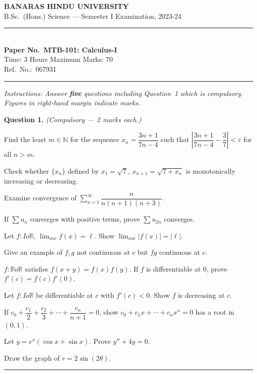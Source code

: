 \documentclass[11pt,a4paper]{article}
\begin{document}
\begin{center}
  {\large\bfseries BANARAS HINDU UNIVERSITY}\\[2pt]
  {\normalsize B.Sc.\ (Hons.) Science --- Semester I Examination, 2023-24}\\[6pt]
  \rule{0.8\linewidth}{0.5pt}\\[6pt]
  {\large\bfseries Paper No.\ MTB-101: Calculus-I}\\[4pt]
  {\normalsize Time: 3 Hours \hfill Maximum Marks: 70}\\[2pt]
  {\small Ref.\ No.:\ 067931}
\end{center}
\rule{\linewidth}{0.4pt}
\smallskip



\noindent   \textit{Instructions: Answer   \textbf{five} questions including Question~1 which is compulsory. Figures in right-hand margin indicate marks.}
\bigskip




\noindent   \textbf{Question 1.}   \textit{(Compulsory --- 2 marks each.)}

\begin{parts}
  \item Find the least $m\in\mathbb{N}$ for the sequence $x_n=\dfrac{3n+1}{7n-4}$ such that $\left|\dfrac{3n+1}{7n-4}-\dfrac{3}{7}\right|<\varepsilon$ for all $n>m$.
  \item Check whether $\{x_n\}$ defined by $x_1=\sqrt{7}$, $x_{n+1}=\sqrt{7+x_n}$ is monotonically increasing or decreasing.
  \item Examine convergence of $\sum_{n=1}^{\infty}\dfrac{n}{n(n+1)(n+3)}$.
  \item If $\sum u_n$ converges with positive terms, prove $\sum u_{2n}$ converges.
  \item Let $f:I o\mathbb{R}$, $\lim_{x o c}f(x)=\ell$. Show $\lim_{x o c}|f(x)|=|\ell|$.
  \item Give an example of $f,g$ not continuous at $c$ but $fg$ continuous at $c$.
  \item $f:\mathbb{R} o\mathbb{R}$ satisfies $f(x+y)=f(x)f(y)$. If $f$ is differentiable at $0$, prove $f'(c)=f(c)f'(0)$.
  \item Let $f:I o\mathbb{R}$ be differentiable at $c$ with $f'(c)<0$. Show $f$ is decreasing at $c$.
  \item If $c_0+\dfrac{c_1}{2}+\dfrac{c_2}{3}+\cdots+\dfrac{c_n}{n+1}=0$, show $c_0+c_1x+\cdots+c_nx^n=0$ has a root in $(0,1)$.
  \item Let $y=e^x(\cos x+\sin x)$. Prove $y''+4y=0$.
  \item Draw the graph of $r=2\sin(2 \theta)$.
\end{parts}
\medskip\rule{\linewidth}{0.2pt}
\end{document}

